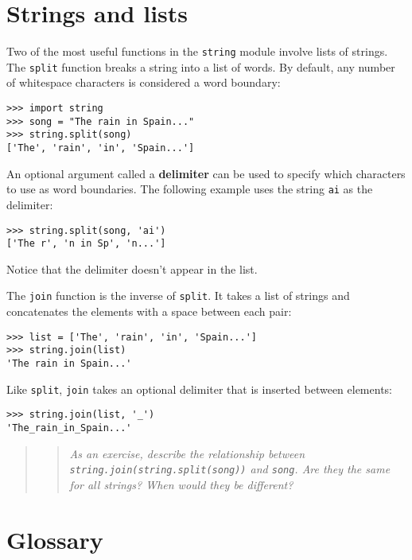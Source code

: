 

\section{Strings and lists}

Two of the most useful functions in the {\tt string} module involve
lists of strings.  The {\tt split} function breaks a string into a
list of words.  By default, any number of whitespace characters is
considered a word boundary:

\beforeverb
\begin{verbatim}
>>> import string
>>> song = "The rain in Spain..."
>>> string.split(song)
['The', 'rain', 'in', 'Spain...']
\end{verbatim}
\afterverb
%
An optional argument called a {\bf delimiter} can be used to specify which
characters to use as word boundaries.
The following example
uses the string {\tt ai} as the delimiter:

\beforeverb
\begin{verbatim}
>>> string.split(song, 'ai')
['The r', 'n in Sp', 'n...']
\end{verbatim}
\afterverb
%
Notice that the delimiter doesn't appear in the list.

The {\tt join} function is the inverse of {\tt split}.  It
takes a list of strings and
concatenates the elements with a space between each pair:

\beforeverb
\begin{verbatim}
>>> list = ['The', 'rain', 'in', 'Spain...']
>>> string.join(list)
'The rain in Spain...'
\end{verbatim}
\afterverb
%
Like {\tt split}, {\tt join} takes an optional delimiter
that is inserted between elements:

\beforeverb
\begin{verbatim}
>>> string.join(list, '_')
'The_rain_in_Spain...'
\end{verbatim}
\afterverb

\begin{quote}
\begin{quote}
{\em As an exercise, describe the relationship between {\tt
string.join(string.split(song))} and {\tt song}.  Are they the same
for all strings?  When would they be different?}
\end{quote}
\end{quote}


\section{Glossary}

